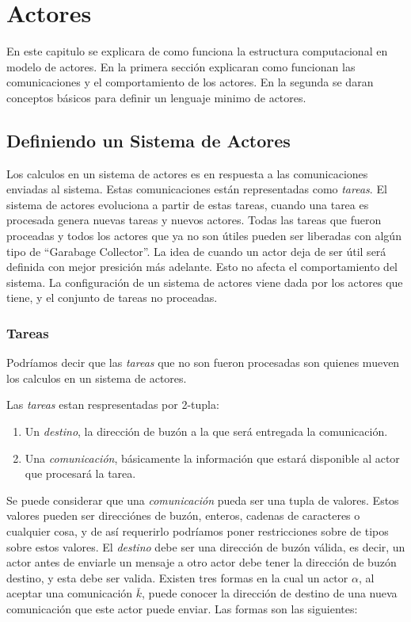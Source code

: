 \chapter{Actores}

En este capitulo se explicara de como funciona la estructura computacional en modelo de actores. En la primera sección explicaran como funcionan las comunicaciones y el comportamiento de los actores. En la segunda se daran conceptos básicos para definir un lenguaje minimo de actores.

\section{Definiendo un Sistema de Actores}

Los calculos en un sistema de actores es en respuesta a las comunicaciones enviadas al sistema. Estas comunicaciones están representadas como \textit{tareas}. El sistema de actores evoluciona a partir de estas tareas, cuando una tarea es procesada genera nuevas tareas y nuevos actores. Todas las tareas que fueron proceadas y todos los actores que ya no son útiles pueden ser liberadas con algún tipo de ``Garabage Collector''. La idea de cuando un actor deja de ser útil será definida con mejor presición más adelante. Esto no afecta el comportamiento del sistema. La configuración de un sistema de actores viene dada por los actores que tiene, y el conjunto de tareas no proceadas.

\subsection{Tareas}

Podríamos decir que las \textit{tareas} que no son fueron procesadas son quienes mueven los calculos en un sistema de actores.

Las \textit{tareas} estan respresentadas por 2-tupla:

\begin{enumerate}
\item Un \textit{destino}, la dirección de buzón a la que será entregada la comunicación.
\item Una \textit{comunicación}, básicamente la información que estará disponible al actor que procesará la tarea.
\end{enumerate}

Se puede considerar que una \textit{comunicación} pueda ser una tupla de valores. Estos valores pueden ser direcciónes de buzón, enteros, cadenas de caracteres o cualquier cosa, y de así requerirlo podríamos poner restricciones sobre de tipos sobre estos valores. 
El \textit{destino} debe ser una dirección de buzón válida, es decir, un actor antes de enviarle un mensaje a otro actor debe tener la dirección de buzón destino, y esta debe ser valida. Existen tres formas en la cual un actor $\alpha$, al aceptar una comunicación $\bar{k}$, puede conocer la dirección de destino de una nueva comunicación que este actor puede enviar. Las formas son las siguientes:

